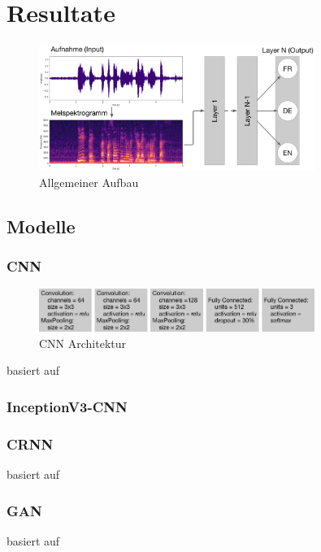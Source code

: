 \section{Resultate}
\begin{figure}[hbt]
	\centering
		\includegraphics[width=0.8\textwidth]{assets/modelflow.png}
	\caption{Allgemeiner Aufbau}
	\label{img:workflow}
\end{figure}


\subsection{Modelle}

\subsubsection{CNN}
\begin{figure}[hbt]
	\centering
		\includegraphics[width=0.8\textwidth]{assets/cnn.png}
	\caption{CNN Architektur}
	\label{img:cnn}
\end{figure}
basiert auf \parencite{iLID}

\subsubsection{InceptionV3-CNN}

\subsubsection{CRNN}
basiert auf \parencite{crnn}

\subsubsection{GAN}
basiert auf \parencite{gan}

